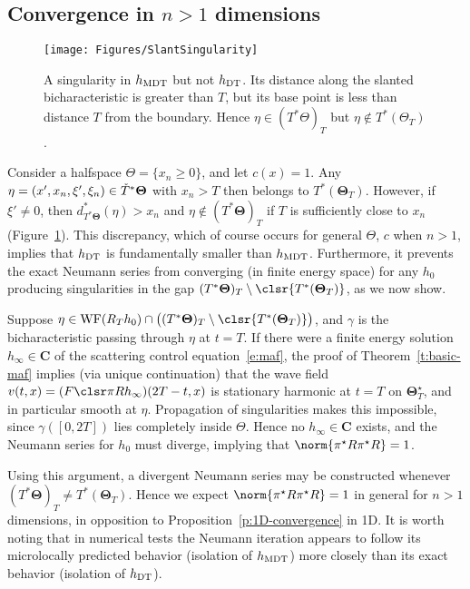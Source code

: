 \documentclass[10pt]{article}
\theoremstyle{plain}
\theoremstyle{definition}
\theoremstyle{remark}
\numberwithin{theorem}{section}
\numberwithin{example}{section}
\numberwithin{equation}{section}
\numberwithin{figure}{section}
\newcommand\bTheta{\boldsymbol\Theta}
\newcommand\To{\smash{\mathring T}\vphantom{T}}			%
\DeclareMathOperator\WF{WF}		%
\newcommand\DT{\ensuremath{_{\text{\normalfont DT}}}}		%
\newcommand\MDT{\ensuremath{_{\text{\normalfont MDT}}}}	%
\begin{document}
\subsection{Convergence in $n>1$ dimensions}

\begin{figure}
	\centering
	\texttt{[image: Figures/SlantSingularity]}
	\caption{A singularity in $h\MDT$ but not $h\DT$. Its distance along the slanted bicharacteristic is greater than $T$, but its base point is less than distance $T$ from the boundary. Hence $\eta\in (T^*\Theta)_T$ but $\eta\notin T^*(\Theta_T)$.}
	\label{f:slant-singularity}
\end{figure}

Consider a halfspace $\Theta=\{x_n\geq 0\}$, and let $c(x)=1$. Any $\eta=(x',x_n,\xi',\xi_n)\in \To^*\bTheta$ with $x_n>T$ then belongs to $T^*(\bTheta_T)$. However, if $\xi'\neq 0$, then $d^*_{T^*\bTheta}(\eta)>x_n$ and $\eta\notin(T^*\bTheta)_T$ if $T$ is sufficiently close to $x_n$ (Figure~\ref{f:slant-singularity}). This discrepancy, which of course occurs for general $\Theta$, $c$ when $n>1$, implies that $h\DT$ is fundamentally smaller than $h\MDT$. Furthermore, it prevents the exact Neumann series from converging (in finite energy space) for any $h_0$ producing singularities in the gap $(T^*\bTheta)_T\setminus \clsr{T^*(\bTheta_T)}$, as we now show.

Suppose $\eta\in\WF(R_Th_0)\cap\big((T^*\bTheta)_T\setminus \clsr{T^*(\bTheta_T)}\big)$, and $\gamma$ is the bicharacteristic passing through $\eta$ at $t=T$. If there were a finite energy solution $h_\infty\in\mathbf C$ of the scattering control equation~\eqref{e:maf}, the proof of Theorem~\ref{t:basic-maf} implies (via unique continuation) that the wave field $v(t,x)=(F\clsr\pi Rh_\infty)(2T-t,x)$ is stationary harmonic at $t=T$ on $\bTheta_T^\star$, and in particular smooth at $\eta$. Propagation of singularities makes this impossible, since $\gamma([0,2T])$ lies completely inside $\Theta$. Hence no $h_\infty\in\mathbf C$ exists, and the Neumann series for $h_0$ must diverge, implying that $\norm{\pi^\star R\pi^\star R}=1$.

Using this argument, a divergent Neumann series may be constructed whenever $(T^*\bTheta)_T \neq T^*(\bTheta_T)$. Hence we expect $\norm{\pi^\star R\pi^\star R}=1$ in general for $n>1$ dimensions, in opposition to Proposition~\ref{p:1D-convergence} in 1D. It is worth noting that in numerical tests the Neumann iteration appears to follow its microlocally predicted behavior (isolation of $h\MDT$) more closely than its exact behavior (isolation of $h\DT$).
\end{document}
